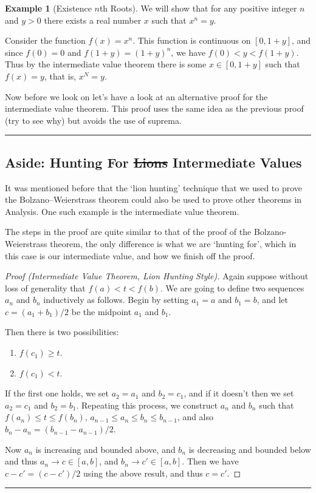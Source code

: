 \documentclass[11pt, a4paper]{article}
\theoremstyle{definition}
\newtheorem{example}[theorem]{Example}
\newenvironment{aside}[1]{
	\noindent
    \rule{\textwidth}{0.025cm}
    \vspace{-1.75\baselineskip}
    \subsection*{#1}}
{\noindent\rule{\textwidth}{0.025cm}}
\begin{document}
\begin{example}[Existence $n$th Roots]
	We will show that for any positive integer $n$ and $y > 0$ there exists a real number $x$ such that $x^n = y$.

	Consider the function $f(x) = x^n$. This function is continuous on $[0, 1 + y]$, and since $f(0) = 0$ and $f(1 + y) = (1 + y)^n$, we have $f(0) < y < f(1 + y)$.
	Thus by the intermediate value theorem there is some $x \in [0, 1+ y]$ such that $f(x) = y$, that is, $x^N = y$.
\end{example}

Now before we look on let's have a look at an alternative proof for the intermediate value theorem. This proof uses the same idea as the previous proof (try to see why) but avoids the use of suprema.

\begin{aside}{Aside: Hunting For \st{Lions} Intermediate Values}
	It was mentioned before that the `lion hunting' technique that we used to prove the Bolzano–Weierstrass theorem could also be used to prove other theorems in Analysis. One such example is the intermediate value theorem.

	The steps in the proof are quite similar to that of the proof of the Bolzano-Weierstrass theorem, the only difference is what we are `hunting for', which in this case is our intermediate value, and how we finish off the proof.

	\begin{proof}[Proof (Intermediate Value Theorem, Lion Hunting Style)]
Again suppose without loss of generality that $f(a) < t < f(b)$.
We are going to define two sequences $a_n$ and $b_n$ inductively as follows. Begin by setting $a_1 = a$ and $b_1=b$, and let $c = (a_1 + b_1)/2$ be the midpoint $a_1$ and $b_1$.

Then there is two possibilities:
\begin{enumerate}
\item $f(c_1) \geq t$.
\item $f(c_1) < t$.
\end{enumerate}
If the first one holds, we set $a_2 = a_1$ and $b_2 = c_1$, and if it doesn't then we set $a_2 = c_1$ and $b_2 = b_1$.
Repeating this process, we construct $a_n$ and $b_n$ such that $f(a_n) \leq t \leq f(b_n)$, $a_{n - 1} \leq a_n \leq b_n \leq b_{n - 1}$, and also $b_n - a_n = (b_{n - 1} - a_{n - 1})/2$.

Now $a_n$ is increasing and bounded above, and $b_n$ is decreasing and bounded below and thus $a_n \rightarrow c \in [a, b]$, and $b_n \rightarrow c' \in [a, b]$. Then we have $c - c' = (c - c')/2$ using the above result, and thus $c = c'$.


\end{proof}
\end{aside}
\end{document}

